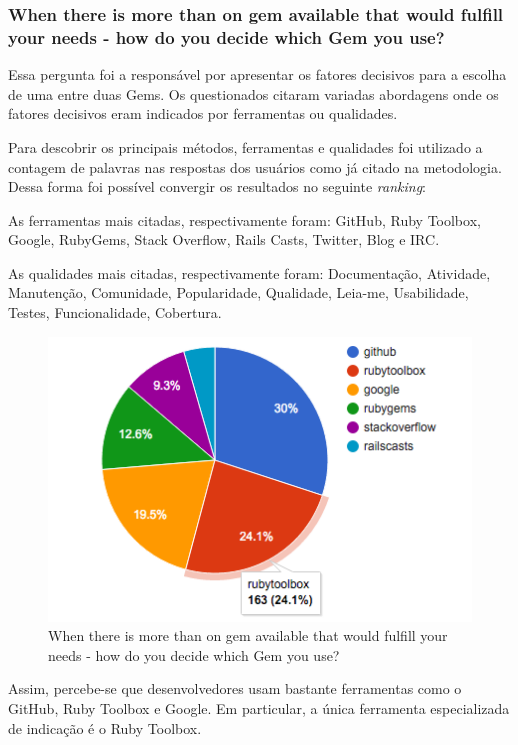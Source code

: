   \subsubsection{When there is more than on gem available that would fulfill your needs - how do you decide which Gem you use?}
  
  Essa pergunta foi a responsável por apresentar os fatores decisivos para a escolha de uma entre duas Gems. Os questionados citaram variadas abordagens onde os fatores decisivos eram indicados por ferramentas ou qualidades.
  
  Para descobrir os principais métodos, ferramentas e qualidades foi utilizado a contagem de palavras nas respostas dos usuários como já citado na metodologia. Dessa forma foi possível convergir os resultados no seguinte \textit{ranking}:
  
  As ferramentas mais citadas, respectivamente foram: GitHub, Ruby Toolbox, Google, RubyGems, Stack Overflow, Rails Casts, Twitter, Blog e IRC.
  
  As qualidades mais citadas, respectivamente foram: Documentação, Atividade, Manutenção, Comunidade, Popularidade, Qualidade, Leia-me, Usabilidade, Testes, Funcionalidade, Cobertura.

\begin{figure}[H]
  \centering
  \includegraphics[width=15cm]{Imagens/tools.png}
  \caption{When there is more than on gem available that would fulfill your needs - how do you decide which Gem you use?}
\end{figure}

Assim, percebe-se que desenvolvedores usam bastante ferramentas como o GitHub, Ruby Toolbox e Google. Em particular, a única ferramenta especializada de indicação é o Ruby Toolbox.

